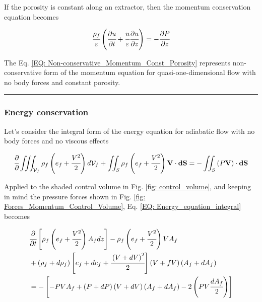 \documentclass[../Article_Model_Parameters.tex]{subfiles}
\begin{document}
	If the porosity is constant along an extractor, then the momentum conservation equation becomes
	
	{\footnotesize
		\begin{equation}
			\cfrac{\rho_f}{\varepsilon} \left( \cfrac{\partial u}{\partial t} + \cfrac{u}{\varepsilon} \cfrac{\partial u}{\partial z} \right) = -\cfrac{\partial P}{\partial z}
			\label{EQ: Non-conservative_Momentum_Const_Porosity}
		\end{equation}
	}

	The Eq. \ref{EQ: Non-conservative_Momentum_Const_Porosity} represents non-conservative form of the momentum equation for quasi-one-dimensional flow with no body forces and constant porosity.
	
	\hrule
	
	\subsubsection{Energy conservation}
	
	Let's consider the integral form of the energy equation for adiabatic flow with no body forces and no viscous effects
	
	{\footnotesize
		\begin{equation}
			\cfrac{\partial}{\partial} \iiint_{\mathcal{V}_f} \rho_f \left( e_f + \cfrac{V^2}{2} \right) d\mathcal{V}_f + \iint_S \rho_f \left( e_f + \cfrac{V^2}{2} \right) \textbf{V} \cdot \textbf{dS} = - \iint_S \left( P\textbf{V} \right) \cdot \textbf{dS}
			\label{EQ: Energy_equation_integral}
		\end{equation}
	}

	Applied to the shaded control volume in Fig. \ref{fig: control_volume}, and keeping in mind the pressure forces shown in Fig. \ref{fig: Forces_Momentum_Control_Volume}, Eq. \ref{EQ: Energy_equation_integral} becomes
	
	{\footnotesize
		\begin{align}
			&\cfrac{\partial}{\partial t} \left[ \rho_f \left( e_f + \cfrac{V^2}{2} \right) A_f dz \right] - \rho_f \left( e_f + \cfrac{V^2}{2} \right) V A_f \nonumber \\
			&+ \left( \rho_f + d\rho_f \right) \left[ e_f + de_f + \cfrac{\left( V + dV \right)^2}{2} \right] \left( V+fV \right) \left( A_f+dA_f \right) \nonumber \\
			&= - \left[ -PVA_f + \left(P+dP\right) \left(V+dV\right) \left(A_f+dA_f\right) - 2\left( PV\cfrac{dA_f}{2} \right) \right]
		\end{align}
	}
	
\end{document}
